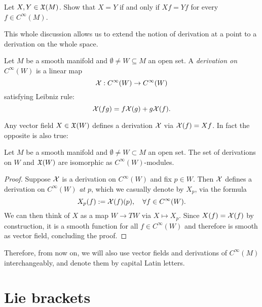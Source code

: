 \begin{exercise}
	Let $X,Y\in\mathfrak{X}(M)$.
	Show that $X=Y$ if and only if $Xf = Yf$ for every $f\in C^\infty(M)$.
\end{exercise}

This whole discussion allows us to extend the notion of derivation at a point to a derivation on the whole space.
\begin{definition}
	Let $M$ be a smooth manifold and $\emptyset\neq W\subseteq M$ an open set.
	A \emph{derivation on $C^\infty(W)$} is a linear map
	\begin{equation}
		\mathcal{X}:C^\infty(W)\to C^\infty(W)
	\end{equation}
	satisfying Leibniz rule:
	\begin{equation}
		\mathcal{X}(fg) = f \mathcal{X}(g) + g \mathcal{X}(f).
	\end{equation}
\end{definition}

Any vector field $X\in\mathfrak{X}(W)$ defines a derivation $\mathcal{X}$ via $\mathcal{X}(f) = Xf$. In fact the opposite is also true:
\begin{proposition}
	Let $M$ be a smooth manifold and $\emptyset\neq W\subset M$ an open set.
	The set of derivations on $W$ and $\mathfrak{X}(W)$ are isomorphic as $C^\infty(W)$-modules.
\end{proposition}
\begin{proof}
	Suppose $\mathcal{X}$ is a derivation on $C^\infty(W)$ and fix $p\in W$. Then $\mathcal{X}$ defines a derivation on $C^\infty(W)$ \emph{at $p$}, which we casually denote by $X_p$, via the formula
	\begin{equation}
		X_p(f) := \mathcal{X}(f)(p), \quad\forall f\in C^\infty(W).
	\end{equation}
	We can then think of $X$ as a map $W\to TW$ via $X\mapsto X_p$.
	Since $X(f)=\mathcal{X}(f)$ by construction, it is a smooth function for all $f\in C^\infty(W)$ and therefore is smooth as vector field, concluding the proof.
\end{proof}

Therefore, from now on, we will also use vector fields and derivations of $C^\infty(M)$ interchangeably, and denote them by capital Latin letters.

\section{Lie brackets}


